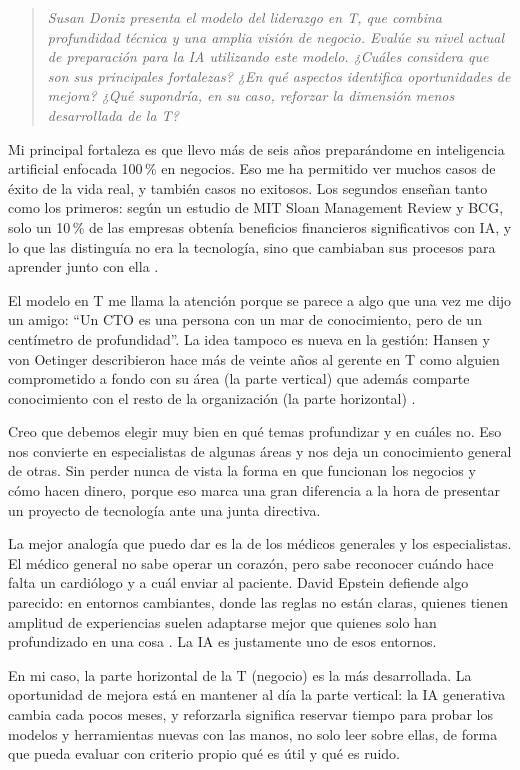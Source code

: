 \documentclass[11pt,letterpaper]{article}
\newcommand{\pregunta}[1]{%
  \begin{quote}\color{cGris}\small\itshape #1\end{quote}}
\begin{document}
\pregunta{Susan Doniz presenta el modelo del liderazgo en T, que combina
profundidad técnica y una amplia visión de negocio. Evalúe su nivel actual de
preparación para la IA utilizando este modelo. ¿Cuáles considera que son sus
principales fortalezas? ¿En qué aspectos identifica oportunidades de mejora?
¿Qué supondría, en su caso, reforzar la dimensión menos desarrollada de la T?}

Mi principal fortaleza es que llevo más de seis años preparándome en
inteligencia artificial enfocada 100\,\% en negocios. Eso me ha permitido ver
muchos casos de éxito de la vida real, y también casos no exitosos. Los
segundos enseñan tanto como los primeros: según un estudio de MIT Sloan
Management Review y BCG, solo un 10\,\% de las empresas obtenía beneficios
financieros significativos con IA, y lo que las distinguía no era la
tecnología, sino que cambiaban sus procesos para aprender junto con ella
\parencite{ransbotham2020}.

El modelo en T me llama la atención porque se parece a algo que una vez me
dijo un amigo: \enquote{Un CTO es una persona con un mar de conocimiento, pero
de un centímetro de profundidad}. La idea tampoco es nueva en la gestión:
Hansen y von Oetinger describieron hace más de veinte años al gerente en T como
alguien comprometido a fondo con su área (la parte vertical) que además
comparte conocimiento con el resto de la organización (la parte horizontal)
\parencite{hansen2001}.

Creo que debemos elegir muy bien en qué temas profundizar y en cuáles no. Eso
nos convierte en especialistas de algunas áreas y nos deja un conocimiento
general de otras. Sin perder nunca de vista la forma en que funcionan los
negocios y cómo hacen dinero, porque eso marca una gran diferencia a la hora
de presentar un proyecto de tecnología ante una junta directiva.

La mejor analogía que puedo dar es la de los médicos generales y los
especialistas. El médico general no sabe operar un corazón, pero sabe
reconocer cuándo hace falta un cardiólogo y a cuál enviar al paciente. David
Epstein defiende algo parecido: en entornos cambiantes, donde las reglas no
están claras, quienes tienen amplitud de experiencias suelen adaptarse mejor
que quienes solo han profundizado en una cosa \parencite{epstein2019}. La IA
es justamente uno de esos entornos.

En mi caso, la parte horizontal de la T (negocio) es la más desarrollada. La
oportunidad de mejora está en mantener al día la parte vertical: la IA
generativa cambia cada pocos meses, y reforzarla significa reservar tiempo
para probar los modelos y herramientas nuevas con las manos, no solo leer
sobre ellas, de forma que pueda evaluar con criterio propio qué es útil y qué
es ruido.
\end{document}
